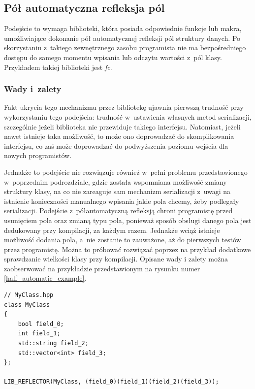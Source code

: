 \documentclass[12pt]{article}
\newcommand{\n}{\newline}
\newcommand{\nonpl}[1]{{\it #1}}
\begin{document}
{		{
			\subsection{Pół automatyczna refleksja pól}

			Podejście to wymaga biblioteki, która posiada odpowiednie funkcje lub makra, umożliwiające dokonanie pół automatycznej
			refleksji pól struktury danych. Po skorzystaniu z~takiego zewnętrznego zasobu programista nie ma bezpośredniego dostępu do samego momentu
			wpisania lub odczytu wartości z~pól klasy. Przykładem takiej biblioteki jest \nonpl{fc}\cite{fc_repo}.\n

			{
				\subsubsection{Wady i~zalety}

				Fakt ukrycia tego mechanizmu przez bibliotekę ujawnia pierwszą trudność przy wykorzystaniu tego podejścia: trudność w~ustawienia własnych
				metod serializacji, szczególnie jeżeli biblioteka nie przewiduje takiego interfejsu. Natomiast, jeżeli nawet istnieje taka możliwość,
				to może ono doprowadzać do skomplikowania interfejsu, co zaś może doprowadzać do podwyższenia poziomu wejścia dla nowych programistów.\n

				Jednakże to podejście nie rozwiązuje również w~pełni problemu przedstawionego w~poprzednim podrozdziale, gdzie została wspomniana
				możliwość zmiany struktury klasy, na co nie zareaguje sam mechanizm serializacji z~uwagi na istnienie
				konieczności manualnego wpisania jakie pola chcemy, żeby podlegały serializacji. Podejście z~półautomatyczną refleksją
				chroni programistę przed usunięciem pola oraz zmianą typu pola, ponieważ sposób obsługi danego pola jest dedukowany przy
				kompilacji, za każdym razem. Jednakże wciąż istnieje możliwość dodania pola, a~nie zostanie to zauważone, aż do pierwszych testów
				przez programistę. Można to próbować rozwiązać poprzez na przykład dodatkowe sprawdzanie wielkości klasy przy kompilacji.
				Opisane wady i zalety można zaobserwować na przykładzie przedstawionym na rysunku numer \ref{half_automatic_example}.\n

				\begin{captioned}[H]
					\begin{lstlisting}[frame=single]
// MyClass.hpp
class MyClass
{
	bool field_0;
	int field_1;
	std::string field_2;
	std::vector<int> field_3;
};

LIB_REFLECTOR(MyClass, (field_0)(field_1)(field_2)(field_3));


\end{lstlisting}
\end{captioned}}}}
\end{document}
